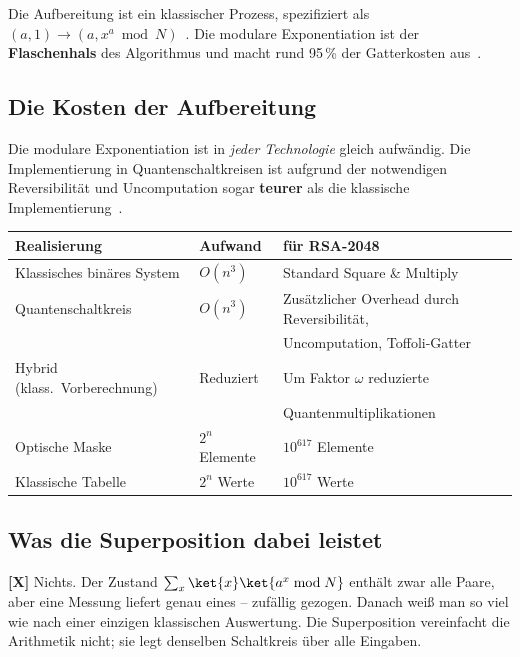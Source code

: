 \begin{keyresult}
Die Aufbereitung ist ein klassischer Prozess, spezifiziert als
$(a,1) \rightarrow (a, x^a \bmod N)$~\cite{Shor1997, IACR2014}.
Die modulare Exponentiation ist der \textbf{Flaschenhals} des
Algorithmus und macht rund 95\,\% der Gatterkosten
aus~\cite{BSI2023, Padho2026}.
\end{keyresult}

\subsection{Die Kosten der Aufbereitung}

Die modulare Exponentiation ist in \emph{jeder Technologie} gleich
aufwändig. Die Implementierung in Quantenschaltkreisen ist aufgrund
der notwendigen Reversibilität und Uncomputation sogar \textbf{teurer}
als die klassische Implementierung~\cite{TrappedIon2021, UoA2024}.

\begin{center}
\begin{tabular}{lll}
\toprule
Realisierung & Aufwand & für RSA-2048 \\
\midrule
Klassisches binäres System & $O(n^3)$ &
  Standard Square \& Multiply~\cite{Shor1997} \\
Quantenschaltkreis & $O(n^3)$ &
  Zusätzlicher Overhead durch Reversibilität, \\
  & & Uncomputation, Toffoli-Gatter~\cite{TrappedIon2021} \\
Hybrid (klass.\ Vorberechnung) & Reduziert &
  Um Faktor $\omega$ reduzierte \\
  & & Quantenmultiplikationen~\cite{Ekera2016} \\
Optische Maske & $2^n$ Elemente & $10^{617}$ Elemente \\
Klassische Tabelle & $2^n$ Werte & $10^{617}$ Werte \\
\bottomrule
\end{tabular}
\end{center}

\subsection{Was die Superposition dabei leistet}

\textbf{[X]} Nichts. Der Zustand
$\sum_x \ket{x}\ket{a^x \bmod N}$ enthält zwar alle Paare, aber eine
Messung liefert genau eines -- zufällig gezogen. Danach weiß man
so viel wie nach einer einzigen klassischen Auswertung. Die
Superposition vereinfacht die Arithmetik nicht; sie legt denselben
Schaltkreis über alle Eingaben.


